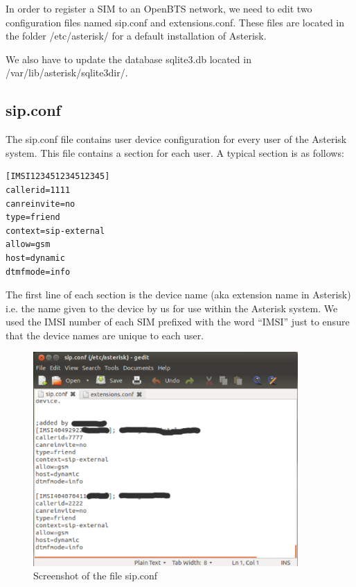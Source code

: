 In order to register a SIM to an OpenBTS network, we need to edit two 
configuration files named \textsf{sip.conf} and \textsf{extensions.conf}. These
files are located in the folder \textsf{/etc/asterisk/} for a default 
installation of Asterisk.

We also have to update the database \textsf{sqlite3.db} located in
\textsf{/var/lib/asterisk/sqlite3dir/}.

\subsection{sip.conf}

The \textsf{sip.conf} file contains user device configuration for every user of 
the Asterisk system. This file contains a section for each user. A typical 
section is as follows:
\begin{verbatim}
[IMSI123451234512345]
callerid=1111
canreinvite=no
type=friend
context=sip-external
allow=gsm
host=dynamic
dtmfmode=info    
\end{verbatim}

The first line of each section is the device name (aka extension name in
Asterisk) i.e. the name given to the device by us for use within the Asterisk
system. We used the IMSI number of each SIM prefixed with the word \textsf{``IMSI''}
just to ensure that the device names are unique to each user.

\begin{figure}
  \centering
    \includegraphics[width=0.9\textwidth]{../images/sip_conf}
  \caption[Screenshot - sip.conf]{Screenshot of the file \textsf{sip.conf}}
  \label{sip_conf}
\end{figure}

